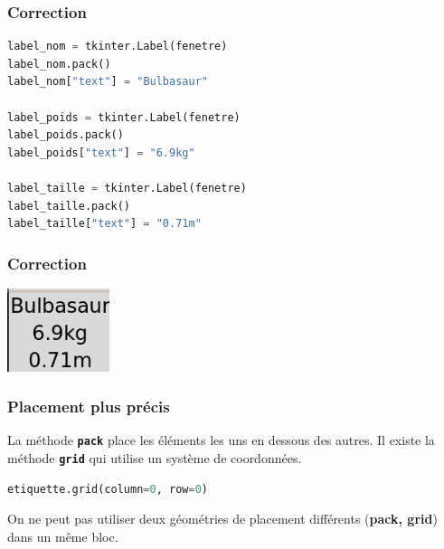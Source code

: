 \documentclass[svgnames,11pt]{beamer}
\begin{document}
\begin{frame}[fragile]
    \frametitle{Correction}
    \begin{center}
        \begin{lstlisting}[language=Python , basicstyle=\ttfamily\small, xleftmargin=1em, xrightmargin=1em]
label_nom = tkinter.Label(fenetre)
label_nom.pack()
label_nom["text"] = "Bulbasaur"

label_poids = tkinter.Label(fenetre)
label_poids.pack()
label_poids["text"] = "6.9kg"

label_taille = tkinter.Label(fenetre)
label_taille.pack()
label_taille["text"] = "0.71m"
\end{lstlisting}
        \label{CODE}
    \end{center}



\end{frame}
\begin{frame}
    \frametitle{Correction}

    \begin{center}
        \centering
        \includegraphics[width=3cm]{ressources/carte0.png}
        \label{IMG}
    \end{center}

\end{frame}
\begin{frame}[fragile]
    \frametitle{Placement plus précis}
    La méthode \textbf{\texttt{pack}} place les éléments les uns en dessous des autres. Il existe la méthode \textbf{\texttt{grid}} qui utilise un système de coordonnées.
    \begin{center}
        \begin{lstlisting}[language=Python , basicstyle=\ttfamily\small, xleftmargin=1em, xrightmargin=1em]
etiquette.grid(column=0, row=0)
\end{lstlisting}
        \label{CODE}
    \end{center}
    \begin{aretenir}[Commentaire]
        On ne peut pas utiliser deux géométries de placement différents (\textbf{pack, grid}) dans un même bloc.

    \end{aretenir}


\end{frame}
\end{document}
